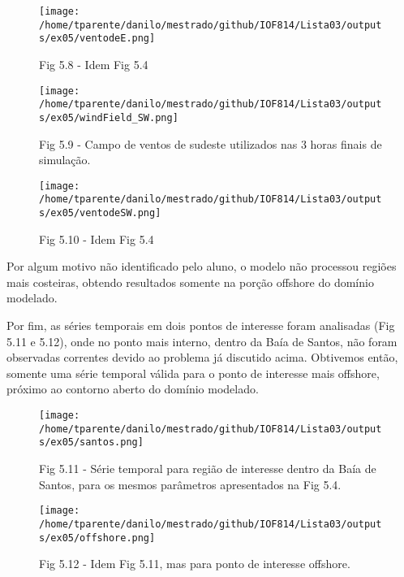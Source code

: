 \documentclass[11pt]{article}
\makeatletter
\def\maxwidth{\ifdim\Gin@nat@width>\linewidth\linewidth
    \else\Gin@nat@width\fi}
\let\Oldincludegraphics\includegraphics
\renewcommand{\includegraphics}[1]{\Oldincludegraphics[width=.8\maxwidth]{#1}}
\makeatother
\begin{document}
\begin{figure}[!ht]
\centering
\centerline{\hbox{\texttt{[image: /home/tparente/danilo/mestrado/github/IOF814/Lista03/outputs/ex05/ventodeE.png]}}}
\caption{Fig 5.8 - Idem Fig 5.4}
\label{fig5:8}
\end{figure}

\begin{figure}[!ht]
\centering
\centerline{\hbox{\texttt{[image: /home/tparente/danilo/mestrado/github/IOF814/Lista03/outputs/ex05/windField\_SW.png]}}}
\caption{Fig 5.9 - Campo de ventos de sudeste utilizados nas 3 horas finais de simulação.}
\label{fig5:9}
\end{figure}

\begin{figure}[!ht]
\centering
\centerline{\hbox{\texttt{[image: /home/tparente/danilo/mestrado/github/IOF814/Lista03/outputs/ex05/ventodeSW.png]}}}
\caption{Fig 5.10 - Idem Fig 5.4}
\label{fig5:10}
\end{figure}

Por algum motivo não identificado pelo aluno, o modelo não processou
regiões mais costeiras, obtendo resultados somente na porção offshore do
domínio modelado.

Por fim, as séries temporais em dois pontos de interesse foram analisadas (Fig 5.11 e 5.12), onde no ponto
mais interno, dentro da Baía de Santos, não foram observadas correntes devido ao problema já discutido acima.
Obtivemos então, somente uma série temporal válida para o ponto de interesse mais offshore, próximo ao contorno
aberto do domínio modelado.

\begin{figure}[!ht]
\centering
\centerline{\hbox{\texttt{[image: /home/tparente/danilo/mestrado/github/IOF814/Lista03/outputs/ex05/santos.png]}}}
\caption{Fig 5.11 - Série temporal para região de interesse dentro da Baía de Santos, para os mesmos parâmetros apresentados na Fig 5.4.}
\label{fig5:9}
\end{figure}

\begin{figure}[!ht]
\centering
\centerline{\hbox{\texttt{[image: /home/tparente/danilo/mestrado/github/IOF814/Lista03/outputs/ex05/offshore.png]}}}
\caption{Fig 5.12 - Idem Fig 5.11, mas para ponto de interesse offshore.}
\label{fig5:12}
\end{figure}




    
\end{document}
